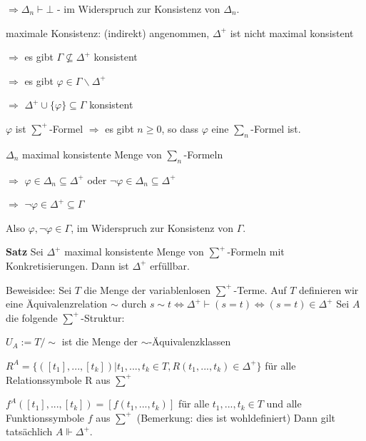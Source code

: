 \documentclass[a4paper]{article}
\renewcommand{\note}[2]{\begin{noteBox} \textbf{#1} #2 \end{noteBox}}
\begin{document}
\begin{multicols}{3}
\begin{enumerate*}
\begin{itemize*}
\begin{itemize*}
\begin{itemize*}
          \item $\Rightarrow \Delta_n\vdash\bot$ - im Widerspruch zur Konsistenz von $\Delta_n$.
        \end{itemize*}
        \item maximale Konsistenz: (indirekt) angenommen, $\Delta^+$ ist nicht maximal konsistent
        \begin{itemize*}
          \item $\Rightarrow$ es gibt $\Gamma\not\subseteq\Delta^+$ konsistent
          \item $\Rightarrow$ es gibt $\varphi\in\Gamma\backslash\Delta^+$
          \item $\Rightarrow$ $\Delta^+\cup\{\varphi\}\subseteq\Gamma$ konsistent
          \item $\varphi$ ist $\sum^+$-Formel $\Rightarrow$ es gibt $n\geq 0$, so dass $\varphi$ eine $\sum_n$-Formel ist.
          \item $\Delta_n$ maximal konsistente Menge von $\sum_n$-Formeln
          \item $\Rightarrow$ $\varphi\in\Delta_n\subseteq\Delta^+$ oder $\lnot\varphi\in\Delta_n\subseteq\Delta^+$
          \item $\Rightarrow$ $\lnot\varphi\in\Delta^+\subseteq\Gamma$
          \item Also $\varphi,\lnot\varphi\in\Gamma$, im Widerspruch zur Konsistenz von $\Gamma$.
        \end{itemize*}
      \end{itemize*}
    \end{itemize*}
  \end{enumerate*}

  \note{Satz}{Sei $\Delta^+$ maximal konsistente Menge von $\sum^+$-Formeln mit Konkretisierungen. Dann ist $\Delta^+$ erfüllbar.}

  Beweisidee: Sei $T$ die Menge der variablenlosen $\sum^+$-Terme. Auf $T$ definieren wir eine Äquivalenzrelation $\sim$ durch $s\sim t\Leftrightarrow \Delta^+\vdash(s=t)\Leftrightarrow (s=t)\in\Delta^+$
  Sei $A$ die folgende $\sum^+$-Struktur:
  \begin{itemize*}
    \item $U_A:=T/\sim$ ist die Menge der $\sim$-Äquivalenzklassen
    \item $R^A=\{([t_1],...,[t_k])|t_1 ,...,t_k\in T,R(t_1,...,t_k)\in\Delta^+\}$ für alle Relationssymbole R aus $\sum^+$
    \item $f^A([t_1],...,[t_k]) = [f(t_1,...,t_k)]$ für alle $t_1,...,t_k\in T$ und alle Funktionssymbole $f$ aus $\sum^+$ (Bemerkung: dies ist wohldefiniert)
    Dann gilt tatsächlich $A\Vdash\Delta^+$.
  \end{itemize*}


\end{multicols}
\end{document}
